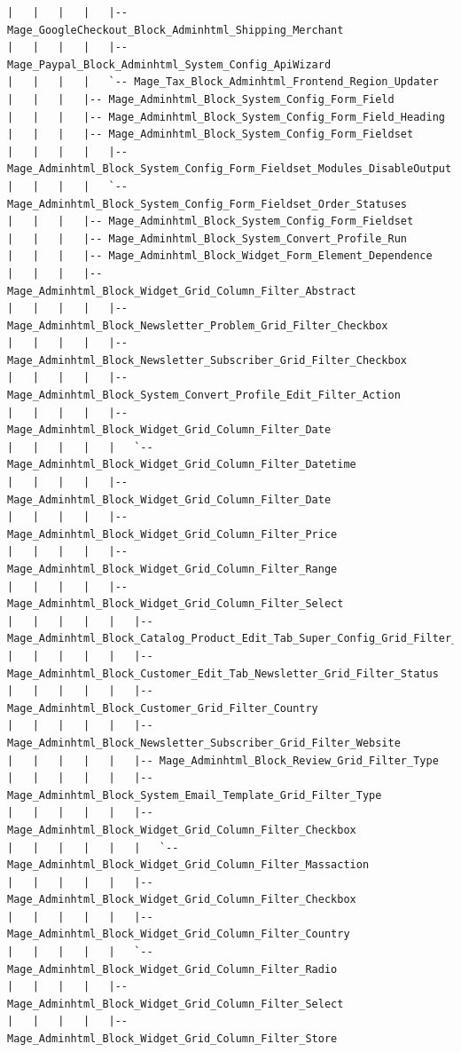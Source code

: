 \documentclass[oneside]{book}
\begin{document}
\begin{lstlisting}
|   |   |   |   |-- Mage_GoogleCheckout_Block_Adminhtml_Shipping_Merchant
|   |   |   |   |-- Mage_Paypal_Block_Adminhtml_System_Config_ApiWizard
|   |   |   |   `-- Mage_Tax_Block_Adminhtml_Frontend_Region_Updater
|   |   |   |-- Mage_Adminhtml_Block_System_Config_Form_Field
|   |   |   |-- Mage_Adminhtml_Block_System_Config_Form_Field_Heading
|   |   |   |-- Mage_Adminhtml_Block_System_Config_Form_Fieldset
|   |   |   |   |-- Mage_Adminhtml_Block_System_Config_Form_Fieldset_Modules_DisableOutput
|   |   |   |   `-- Mage_Adminhtml_Block_System_Config_Form_Fieldset_Order_Statuses
|   |   |   |-- Mage_Adminhtml_Block_System_Config_Form_Fieldset
|   |   |   |-- Mage_Adminhtml_Block_System_Convert_Profile_Run
|   |   |   |-- Mage_Adminhtml_Block_Widget_Form_Element_Dependence
|   |   |   |-- Mage_Adminhtml_Block_Widget_Grid_Column_Filter_Abstract
|   |   |   |   |-- Mage_Adminhtml_Block_Newsletter_Problem_Grid_Filter_Checkbox
|   |   |   |   |-- Mage_Adminhtml_Block_Newsletter_Subscriber_Grid_Filter_Checkbox
|   |   |   |   |-- Mage_Adminhtml_Block_System_Convert_Profile_Edit_Filter_Action
|   |   |   |   |-- Mage_Adminhtml_Block_Widget_Grid_Column_Filter_Date
|   |   |   |   |   `-- Mage_Adminhtml_Block_Widget_Grid_Column_Filter_Datetime
|   |   |   |   |-- Mage_Adminhtml_Block_Widget_Grid_Column_Filter_Date
|   |   |   |   |-- Mage_Adminhtml_Block_Widget_Grid_Column_Filter_Price
|   |   |   |   |-- Mage_Adminhtml_Block_Widget_Grid_Column_Filter_Range
|   |   |   |   |-- Mage_Adminhtml_Block_Widget_Grid_Column_Filter_Select
|   |   |   |   |   |-- Mage_Adminhtml_Block_Catalog_Product_Edit_Tab_Super_Config_Grid_Filter_Inventory
|   |   |   |   |   |-- Mage_Adminhtml_Block_Customer_Edit_Tab_Newsletter_Grid_Filter_Status
|   |   |   |   |   |-- Mage_Adminhtml_Block_Customer_Grid_Filter_Country
|   |   |   |   |   |-- Mage_Adminhtml_Block_Newsletter_Subscriber_Grid_Filter_Website
|   |   |   |   |   |-- Mage_Adminhtml_Block_Review_Grid_Filter_Type
|   |   |   |   |   |-- Mage_Adminhtml_Block_System_Email_Template_Grid_Filter_Type
|   |   |   |   |   |-- Mage_Adminhtml_Block_Widget_Grid_Column_Filter_Checkbox
|   |   |   |   |   |   `-- Mage_Adminhtml_Block_Widget_Grid_Column_Filter_Massaction
|   |   |   |   |   |-- Mage_Adminhtml_Block_Widget_Grid_Column_Filter_Checkbox
|   |   |   |   |   |-- Mage_Adminhtml_Block_Widget_Grid_Column_Filter_Country
|   |   |   |   |   `-- Mage_Adminhtml_Block_Widget_Grid_Column_Filter_Radio
|   |   |   |   |-- Mage_Adminhtml_Block_Widget_Grid_Column_Filter_Select
|   |   |   |   |-- Mage_Adminhtml_Block_Widget_Grid_Column_Filter_Store

\end{lstlisting}
\end{document}
